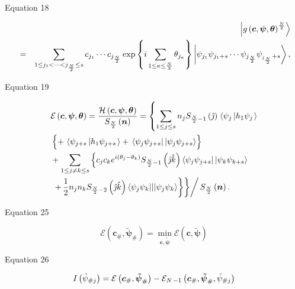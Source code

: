 \documentclass{article}
\begin{document}
Equation 18

\begin{eqnarray*}
&&\left\vert g\left( \boldsymbol{c},\boldsymbol{\psi },\boldsymbol{\theta }%
\right) ^{\frac{N}{2}}\right\rangle  \\
&=&\sum_{1\leq j_{1}<\cdots <j_{\frac{N}{2}}\leq s}c_{j_{1}}\cdots c_{j_{%
\frac{N}{2}}}\exp \left\{ i\sum\limits_{1\leq \kappa \leq \frac{N}{2}}\theta
_{j_{\kappa }}\right\} \left\vert \psi _{j_{1}}\psi _{j_{1}+s}\cdots \psi
_{j_{\frac{N}{2}}}\psi _{_{j_{\frac{N}{2}}}+s}\right\rangle ,
\end{eqnarray*}

Equation 19

\begin{align*}
& \mathcal{E}\left( \boldsymbol{c},\boldsymbol{\psi },\boldsymbol{\theta }%
\right) =\frac{\mathcal{H}\left( \boldsymbol{c},\boldsymbol{\psi },%
\boldsymbol{\theta }\right) }{S_{\frac{N}{2}}\left( \boldsymbol{n}\right) }%
=\left\{ \sum_{1\leq j\leq s}n_{j}S_{\frac{N}{2}-1}\left( \hat{\jmath}%
\right) \right. \left\langle \psi _{j}\left\vert h_{1}\psi _{j}\right.
\right\rangle  \\
& \left\{ \overset{}{+\,\left\langle \psi _{j+s}\left\vert h_{1}\psi
_{j+s}\right. \right\rangle }+\,\left\langle \psi _{j}\psi _{j+s}\right\vert
\left\vert \psi _{j}\psi _{j+s}\right\rangle \right\}  \\
& +\sum_{1\leq j\neq k\leq s}\left\{ c_{j}c_{k}e^{i\left( \theta _{j}-\theta
_{k}\right) }S_{\frac{N}{2}-1}\left( \hat{\jmath}\hat{k}\right) \left\langle
\psi _{j}\psi _{j+s}\right\vert \left\vert \psi _{k}\psi _{k+s}\right\rangle
\right.  \\
& \left. \left. \left. +\,\frac{1}{2}\overset{}{n_{j}n_{k}S_{\frac{N}{2}%
-2}\left( \hat{\jmath}\hat{k}\right) \left\langle \psi _{j}\psi _{k}|||\psi
_{j}\psi _{k}\right\rangle }\right\} \right\} \right/ S_{\frac{N}{2}}\left( 
\boldsymbol{n}\right) .
\end{align*}

Equation 25

\[
\mathcal{E}\left( \boldsymbol{c}_{\#},\boldsymbol{\tilde{\psi}}_{\#}\right)
=\min_{\boldsymbol{c},\boldsymbol{\tilde{\psi}}}\mathcal{E}\left( 
\boldsymbol{c},\boldsymbol{\tilde{\psi}}\right) 
\]

Equation 26

\[
I\left( \tilde{\psi}_{\#j}\right) =\mathcal{E}\left( \boldsymbol{c}_{\#},%
\boldsymbol{\tilde{\psi}}_{\#}\right) -\mathcal{E}_{N\,-1}\left( \boldsymbol{%
c}_{\#},\boldsymbol{\tilde{\psi}}_{\#},\tilde{\psi}_{\#j}\right) 
\]
\end{document}
